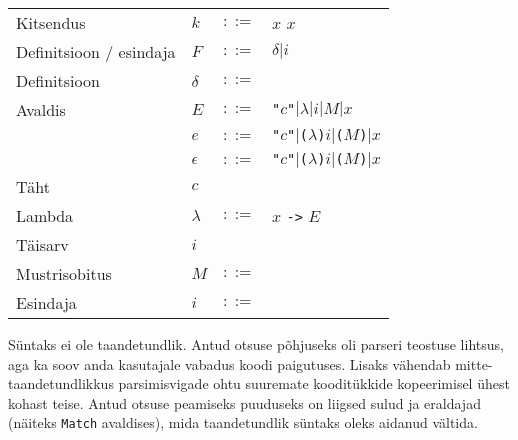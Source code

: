 \documentclass[12pt]{article}
\begin{document}
\begin{tabular}{llll}
      Kitsendus & $k$ & $::=$ & $x$ $x$ \\
      Definitsioon / esindaja & $F$ & $::=$ & $\delta|i$ \\
      Definitsioon & $\delta$ & $::=$ &  \\
      Avaldis & $E$ & $::=$ & {\color{helehall}\verb!"!}$c${\color{helehall}\verb!"!}$|\lambda|i|M|x$ \\
         & $e$ & $::=$ & {\color{helehall}\verb!"!}$c${\color{helehall}\verb!"!}$|${\color{helehall}\verb!(!}$\lambda${\color{helehall}\verb!)!}$i|${\color{helehall}\verb!(!}$M${\color{helehall}\verb!)!}$|x$ \\
         & $\epsilon$ & $::=$ & {\color{helehall}\verb!"!}$c${\color{helehall}\verb!"!}$|${\color{helehall}\verb!(!}$\lambda${\color{helehall}\verb!)!}$i|${\color{helehall}\verb!(!}$M${\color{helehall}\verb!)!}$|x$ \\
      Täht & $c$ & &  \\
      Lambda & $\lambda$ & $::=$ & $x$ {\color{helehall}\verb!->!} $E$ \\
      Täisarv & $i$ &  &  \\
      Mustrisobitus & $M$ & $::=$ &  \\
      Esindaja & $i$ & $::=$ &  \\
    \end{tabular}
\begin{comment}
  data Brnch_0 = Brnch_0 Name [Name] Name [(Name, Type_0)] deriving Show
  data Data_br_0 = Branching_data_0 Name [Kind_0] [(Name, Kind_0)] [Brnch_0] | Plain_data_0 [(Name, Kind_0)] Data_branch_0
  data Data_branch_0 = Algebraic_data_0 [Form_0]
  data Def_0 =
    Basic_def_0 Name [(Name, Kind_0)] [Constraint_0] [(Pattern_1, Type_0)] Type_0 Expression_0 |
    Instance_def_0 Location_0 Name Name [Kind_0] [Pattern_1] [Constraint_0] [(Name, ([Pattern_1], Expression_0))]
  data Expression_branch_0 =
    Application_expression_0 Expression_0 Expression_0
  data Match_Algebraic_0 = Match_Algebraic_0 Name [Pattern_1] Expression_0 deriving Show
  data Match_char_0 = Match_char_0 Char Expression_0 deriving Show
  data Match_Int_0 = Match_Int_0 Integer Expression_0 deriving Show
  data Matches_0 =
    Matches_Algebraic_0 [Match_Algebraic_0] (Maybe (Location_0, Expression_0)) |
    Matches_char_0 [Match_char_0] Expression_0 |
    Matches_Int_0 [Match_Int_0] Expression_0
      deriving Show
\end{comment}
    Süntaks ei ole taandetundlik. Antud otsuse põhjuseks oli parseri teostuse lihtsus, aga ka soov anda kasutajale vabadus koodi paigutuses. Lisaks vähendab mitte-taandetundlikkus parsimisvigade ohtu suuremate kooditükkide kopeerimisel ühest kohast teise. Antud otsuse peamiseks puuduseks on liigsed sulud ja eraldajad (näiteks \verb!Match! avaldises), mida taandetundlik süntaks oleks aidanud vältida.
\end{document}
